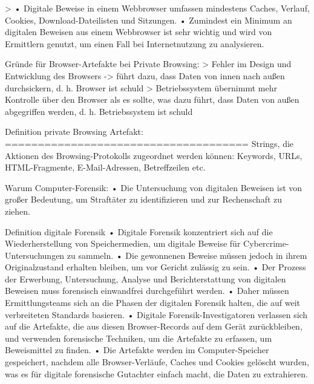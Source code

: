 	> \cite{Rochmadi.2017}
		•	Digitale Beweise in einem Webbrowser umfassen mindestens Caches, Verlauf, Cookies, Download-Dateilisten und Sitzungen.
		•	Zumindest ein Minimum an digitalen Beweisen aus einem Webbrowser ist sehr wichtig und wird von Ermittlern genutzt, um einen Fall bei Internetnutzung zu analysieren.
		
Gründe für Browser-Artefakte bei Private Browsing: \cite{Horsman.2019}
	> Fehler im Design und Entwicklung des Browsers -> führt dazu, dass Daten von innen nach außen durchsickern, d. h. Browser ist schuld 
	> Betriebssystem übernimmt mehr Kontrolle über den Browser als es sollte, was dazu führt, dass Daten von außen abgegriffen werden, d. h. Betriebssystem ist schuld


Definition private Browsing Artefakt:
=====================================
Strings, die Aktionen des Browsing-Protokolls zugeordnet werden können: Keywords, URLs, HTML-Fragmente, E-Mail-Adressen, Betreffzeilen etc.



Warum Computer-Forensik: \cite{Mahlous.2020}
	•	Die Untersuchung von digitalen Beweisen ist von großer Bedeutung, um Straftäter zu identifizieren und zur Rechenschaft zu ziehen.


Definition digitale Forensik \cite{Izzati.2022}
	•	Digitale Forensik konzentriert sich auf die Wiederherstellung von Speichermedien, um digitale Beweise für Cybercrime-Untersuchungen zu sammeln.
	•	Die gewonnenen Beweise müssen jedoch in ihrem Originalzustand erhalten bleiben, um vor Gericht zulässig zu sein.
	•	Der Prozess der Erwerbung, Untersuchung, Analyse und Berichterstattung von digitalen Beweisen muss forensisch einwandfrei durchgeführt werden.
	•	Daher müssen Ermittlungsteams sich an die Phasen der digitalen Forensik halten, die auf weit verbreiteten Standards basieren.
	•	Digitale Forensik-Investigatoren verlassen sich auf die Artefakte, die aus diesen Browser-Records auf dem Gerät zurückbleiben, und verwenden forensische Techniken, um die Artefakte zu erfassen, um Beweismittel zu finden.
	•	Die Artefakte werden im Computer-Speicher gespeichert, nachdem alle Browser-Verläufe, Caches und Cookies gelöscht wurden, was es für digitale forensische Gutachter einfach macht, die Daten zu extrahieren.


